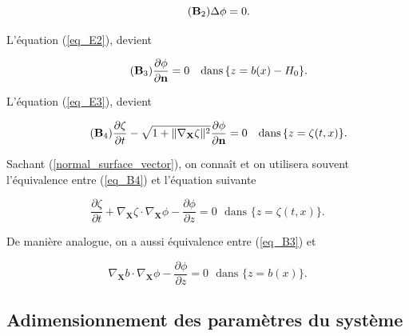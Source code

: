 \documentclass[12pt,a4paper]{article}
\numberwithin{equation}{section}
\begin{document}
\begin{equation} \tag{$\textbf{B}_2$} \label{eq_B2}
    \Delta \phi = 0.
\end{equation}

L'équation (\ref{eq_E2}), devient

\begin{equation} \tag{$\textbf{B}_3$} \label{eq_B3}
    \frac{\partial \phi}{\partial \textbf{n}} = 0 ~~~ \text{dans}\,\{z = b(x)-H_0\} .
\end{equation}

L'équation (\ref{eq_E3}), devient

\begin{equation} \tag{$\textbf{B}_4$} \label{eq_B4}
\frac{\partial \zeta}{\partial t}  - \sqrt{1+ \| \nabla_\textbf{X}\zeta\|^2}\frac{\partial \phi}{\partial\textbf{n}} = 0~~~\text{dans}\,\{z = \zeta(t,x)\} .
\end{equation}

Sachant (\ref{normal_surface_vector}), on connaît et on utilisera souvent l'équivalence entre (\ref{eq_B4}) et l'équation suivante


\begin{equation} \label{eq_B4_bis}
    \frac{\partial \zeta}{\partial t}  + \nabla_\textbf{X}\zeta\cdot\nabla_\textbf{X}\phi - \frac{\partial\phi}{\partial z} = 0 ~~~\text{dans }\{z = \zeta(t,x)\} .
\end{equation}

De manière analogue, on a aussi équivalence entre (\ref{eq_B3}) et 

\begin{equation} \label{eq_B3_bis}
    \nabla_\textbf{X}b\cdot\nabla_\textbf{X}\phi - \frac{\partial\phi}{\partial z} = 0 ~~~\text{dans }\{z = b(x)\} .
\end{equation}


\subsection{Adimensionnement des paramètres du système}
\end{document}
